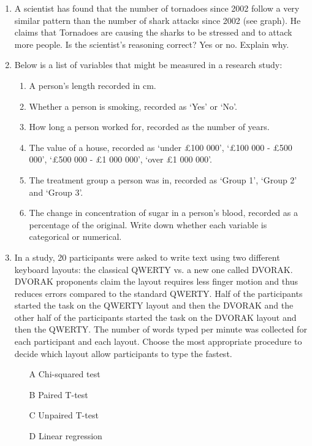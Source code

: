 \documentclass{article}
\newif\ifanswer
\begin{document}
\begin{enumerate}
\item A scientist has found that the number of tornadoes since 2002
  follow a very similar pattern than the number of shark attacks since
  2002 (see graph). He claims that Tornadoes are causing the sharks to
  be stressed and to attack more people. Is the scientist's reasoning
  correct? Yes or no. Explain why.


  \ifanswer

  (Answer: No. The graphs show a correlation between the two data sets but not causality.  A correlation does not mean that the change in one variable is the cause of the change in the values of the other variable.
  \fi

\item Below is a list of variables that might be measured in a research study:
\begin{enumerate}
\item A person's length recorded in cm.
\item Whether a person is smoking, recorded as \lq{}Yes\rq{} or \lq{}No\rq{}.
\item How long a person worked for, recorded as the number of years.
\item The value of a house, recorded as \lq{}under \pounds 100 000\rq{}, \lq{}\pounds 100 000 - \pounds 500 000\rq{}, \lq{}\pounds 500 000 - \pounds 1 000 000\rq{}, \lq{}over \pounds 1 000 000\rq{}.
\item The treatment group a person was in, recorded as \lq{}Group 1\rq{}, \lq{}Group 2\rq{} and \lq{}Group 3\rq{}.
\item The change in concentration of sugar in a person's blood, recorded as a percentage of the original.
Write down whether each variable is categorical or numerical.
\end{enumerate}

\ifanswer
 (Answer: b, d, e are categorical; a, c, f are numerical.)
\fi

\item In a study, 20 participants were asked to write text using two
  different keyboard layouts: the classical QWERTY vs. a new one
  called DVORAK. DVORAK proponents claim the layout requires less
  finger motion and thus reduces errors compared to the standard
  QWERTY. Half of the participants started the task on the QWERTY
  layout and then the DVORAK and the other half of the participants
  started the task on the DVORAK layout and then the QWERTY. The
  number of words typed per minute was collected for each participant
  and each layout. Choose the most appropriate procedure to decide
  which layout allow participants to type the fastest.
  \begin{itemize}
    \item[A] Chi-squared test 
\item[B] Paired T-test
\item[C] Unpaired T-test
\item[D] Linear regression
  \end{itemize}
  

\end{enumerate}
\end{document}
